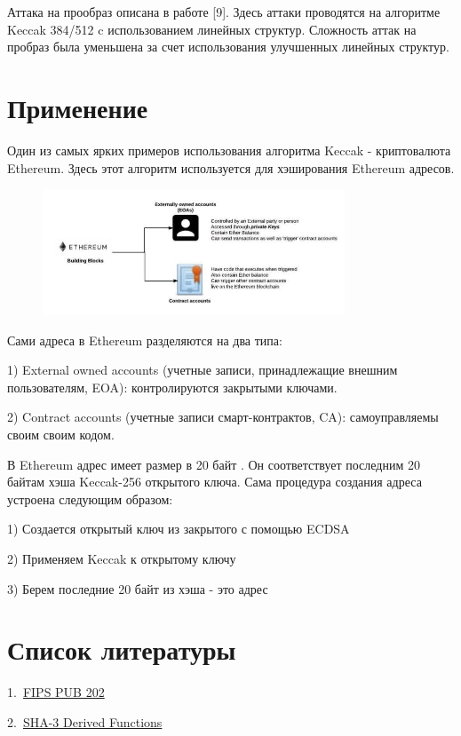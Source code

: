 \documentclass[a4paper,12pt]{article}
\theoremstyle{plain} %
\theoremstyle{definition} %
\theoremstyle{remark} %
\begin{document}
	Аттака на прообраз описана в работе [9]. Здесь аттаки проводятся на алгоритме Keccak 384/512 c использованием линейных структур. Сложность аттак на пробраз была уменьшена за счет использования улучшенных линейных структур.
	
	
	
	\section{Применение}
	
	Один из самых ярких примеров использования алгоритма Keccak - криптовалюта Ethereum. Здесь этот алгоритм используется для хэширования Ethereum адресов.
	
	\begin{figure}[h!]
		\centering
		\includegraphics[width=90mm]{3.png}
	\end{figure}
	
	Сами адреса в Ethereum разделяются на два типа:
	
	1) External owned accounts (учетные записи, принадлежащие внешним пользователям, EOA): контролируются закрытыми ключами.
	
	2) Contract accounts (учетные записи смарт-контрактов, CA): самоуправляемы своим своим кодом.
	
	В Ethereum  адрес имеет размер в 20 байт . Он соответствует последним 20 байтам хэша Keccak-256 открытого ключа. Сама процедура создания адреса устроена следующим образом:
	
	1) Создается открытый ключ из закрытого с помощью ECDSA
	
	2) Применяем Keccak к открытому ключу
	
	3) Берем последние 20 байт из хэша - это адрес
	
	\section{Список литературы}
	
	1.\ \href{https://dx.doi.org/10.6028%2Fnist.fips.202}{FIPS PUB 202}

	
	2.\ \href{https://doi.org/10.6028/NIST.SP.800-185}{SHA-3 Derived Functions}
	
\end{document}
